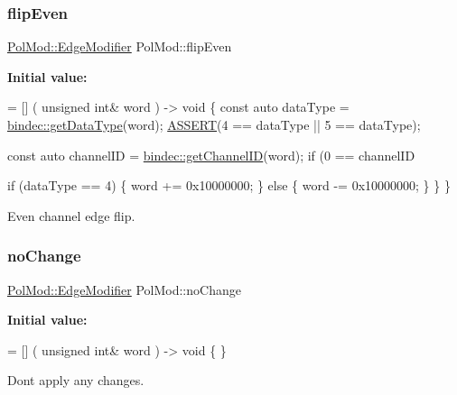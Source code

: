 \subsubsection{\texorpdfstring{flip\+Even}{flipEven}}
{\footnotesize\ttfamily \hyperlink{namespace_pol_mod_a85db6c8495e67b2d486ea7dcf7f6aad4}{Pol\+Mod\+::\+Edge\+Modifier} Pol\+Mod\+::flip\+Even}

{\bfseries Initial value\+:}
\begin{DoxyCode}
= [] (
    \textcolor{keywordtype}{unsigned} \textcolor{keywordtype}{int}& word
) -> \textcolor{keywordtype}{void} \{
    \textcolor{keyword}{const} \textcolor{keyword}{auto} dataType = \hyperlink{namespacebindec_a7a98adfd04c65f870f74a423bfd744fe}{bindec::getDataType}(word);
    \hyperlink{_debug_8hpp_aca68c0d4ac8df0838e209fb5300f7be3}{ASSERT}(4 == dataType || 5 == dataType);

    
    \textcolor{keyword}{const} \textcolor{keyword}{auto} channelID = \hyperlink{namespacebindec_af1997af0743251d010780a8f728fcd7e}{bindec::getChannelID}(word);
    \textcolor{keywordflow}{if} (0 == channelID%
        
        \textcolor{keywordflow}{if} (dataType == 4) \{
            word += 0x10000000;
        \} \textcolor{keywordflow}{else} \{
            word -= 0x10000000;
        \}
    \}
\}
\end{DoxyCode}


Even channel edge flip. 

\mbox{\label{namespace_pol_mod_a3bf89c0439812d613ba363a866c30817}} 
\subsubsection{\texorpdfstring{no\+Change}{noChange}}
{\footnotesize\ttfamily \hyperlink{namespace_pol_mod_a85db6c8495e67b2d486ea7dcf7f6aad4}{Pol\+Mod\+::\+Edge\+Modifier} Pol\+Mod\+::no\+Change}

{\bfseries Initial value\+:}
\begin{DoxyCode}
= [] (
    \textcolor{keywordtype}{unsigned} \textcolor{keywordtype}{int}& word
) -> \textcolor{keywordtype}{void} \{ \}
\end{DoxyCode}


Don\textquotesingle{}t apply any changes. 

